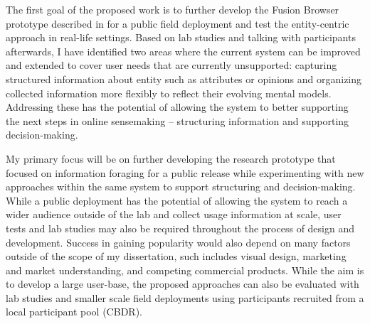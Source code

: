 

The first goal of the proposed work is to further develop the Fusion Browser prototype described in  for a public field deployment and test the entity-centric approach in real-life settings. Based on lab studies and talking with participants afterwards, I have identified two areas where the current system can be improved and extended to cover user needs that are currently unsupported: capturing structured information about entity such as attributes or opinions and organizing collected information more flexibly to reflect their evolving mental models. Addressing these has the potential of allowing the system to better supporting the next steps in online sensemaking -- structuring information and supporting decision-making.

My primary focus will be on further developing the research prototype that focused on information foraging for a public release while experimenting with new approaches within the same system to support structuring and decision-making. While a public deployment has the potential of allowing the system to reach a wider audience outside of the lab and collect usage information at scale, user tests and lab studies may also be required throughout the process of design and development.
Success in gaining popularity would also depend on many factors outside of the scope of my dissertation, such includes visual design, marketing and market understanding, and competing commercial products. While the aim is to develop a large user-base, the proposed approaches can also be evaluated with lab studies and smaller scale field deployments using participants recruited from a local participant pool (CBDR). 

